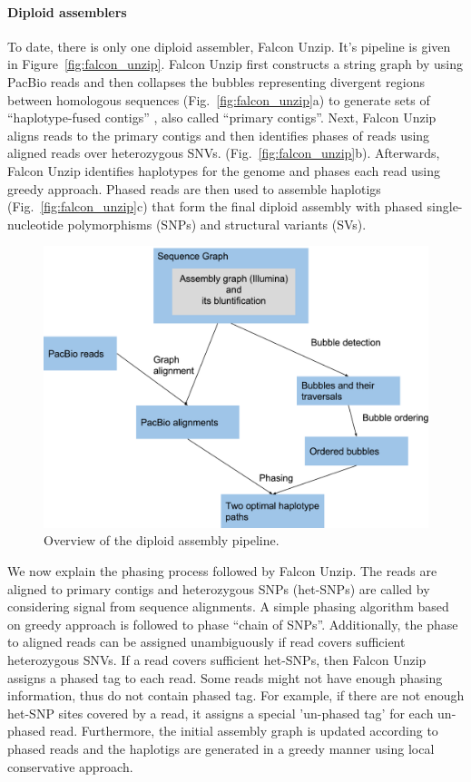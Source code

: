 \paragraph{Diploid assemblers}
To date, there is only one diploid assembler, Falcon Unzip. It's pipeline is given in Figure~\ref{fig:falcon_unzip}.
Falcon Unzip first constructs a string graph by using PacBio reads and then collapses the bubbles representing divergent regions between homologous sequences (Fig.~\ref{fig:falcon_unzip}a) to generate sets of ``haplotype-fused contigs'' , also called ``primary contigs''. 
Next, Falcon Unzip aligns reads to the primary contigs and then identifies phases of reads using aligned reads over heterozygous SNVs. (Fig.~\ref{fig:falcon_unzip}b). 
Afterwards, Falcon Unzip identifies haplotypes for the genome and phases each read using greedy approach.
Phased reads are then used to assemble haplotigs (Fig.~\ref{fig:falcon_unzip}c) 
that form the final diploid assembly with phased single-nucleotide polymorphisms (SNPs) and structural variants (SVs).
\begin{figure}[t!]\centering
\includegraphics[width=.8\columnwidth]{pipeline.pdf}
\caption{Overview of the diploid assembly pipeline. }
\label{fig:pipeline}
\end{figure}

We now explain the phasing process followed by Falcon Unzip.
The reads are aligned to primary contigs and heterozygous SNPs (het-SNPs) are called by considering signal from sequence alignments.
A simple phasing algorithm based on greedy approach is followed to phase ``chain of SNPs''. 
Additionally, the phase to aligned reads can be assigned unambiguously if read covers sufficient heterozygous SNVs.
If a read covers sufficient het-SNPs, then Falcon Unzip assigns a phased tag to each read.
Some reads might not have enough phasing information, thus do not contain phased tag.
For example, if there are not enough het-SNP sites covered by a read, it assigns a special 'un-phased tag' for each un-phased read.
Furthermore, the initial assembly graph is updated according to phased reads and the haplotigs are generated in a greedy manner using local conservative approach.

